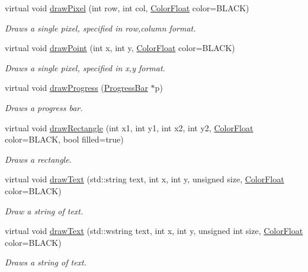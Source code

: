 \begin{DoxyCompactItemize}
virtual void \hyperlink{classtsgl_1_1_canvas_af17d456eca4ad5a55842f2cf02f48a97}{draw\-Pixel} (int row, int col, \hyperlink{structtsgl_1_1_color_float}{Color\-Float} color=B\-L\-A\-C\-K)
\begin{DoxyCompactList}\small\item\em Draws a single pixel, specified in row,column format. \end{DoxyCompactList}\item 
virtual void \hyperlink{classtsgl_1_1_canvas_a6c17c90cd13f7b0184a25e4acc2b7426}{draw\-Point} (int x, int y, \hyperlink{structtsgl_1_1_color_float}{Color\-Float} color=B\-L\-A\-C\-K)
\begin{DoxyCompactList}\small\item\em Draws a single pixel, specified in x,y format. \end{DoxyCompactList}\item 
virtual void \hyperlink{classtsgl_1_1_canvas_aea792059486ebe6d25d7f81bdadf751d}{draw\-Progress} (\hyperlink{classtsgl_1_1_progress_bar}{Progress\-Bar} $\ast$p)
\begin{DoxyCompactList}\small\item\em Draws a progress bar. \end{DoxyCompactList}\item 
virtual void \hyperlink{classtsgl_1_1_canvas_a752754cd16d14447cb5e5b0438bebf16}{draw\-Rectangle} (int x1, int y1, int x2, int y2, \hyperlink{structtsgl_1_1_color_float}{Color\-Float} color=B\-L\-A\-C\-K, bool filled=true)
\begin{DoxyCompactList}\small\item\em Draws a rectangle. \end{DoxyCompactList}\item 
virtual void \hyperlink{classtsgl_1_1_canvas_a3457e7ebd17fa5003025ff6bcaaeedf6}{draw\-Text} (std\-::string text, int x, int y, unsigned size, \hyperlink{structtsgl_1_1_color_float}{Color\-Float} color=B\-L\-A\-C\-K)
\begin{DoxyCompactList}\small\item\em Draw a string of text. \end{DoxyCompactList}\item 
virtual void \hyperlink{classtsgl_1_1_canvas_a0687604ebe60b37e8685671252172996}{draw\-Text} (std\-::wstring text, int x, int y, unsigned int size, \hyperlink{structtsgl_1_1_color_float}{Color\-Float} color=B\-L\-A\-C\-K)
\begin{DoxyCompactList}\small\item\em Draws a string of text. \end{DoxyCompactList}\item 

\end{DoxyCompactItemize}
